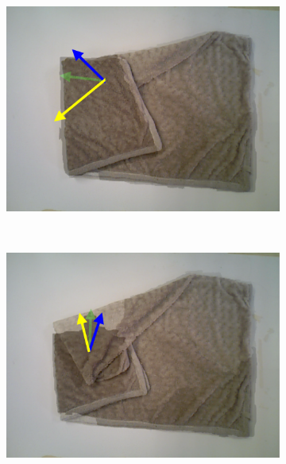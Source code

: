 \begin{figure}[htbp]
	\centering
    \begin{subfigure}[l]{0.49\textwidth}
	    \centering
    	\includegraphics[width=\textwidth]
    	{figures/directions-01.pdf}
    	\vspace{-10px}
	\end{subfigure}
	~
    \begin{subfigure}[r]{0.49\textwidth}
	    \centering
    	\includegraphics[width=\textwidth]
    	{figures/directions-02.pdf}
    	\vspace{-10px}
	\end{subfigure} 
	~
	\begin{subfigure}[l]{0.49\textwidth}
	    \centering

\end{subfigure}
\end{figure}
